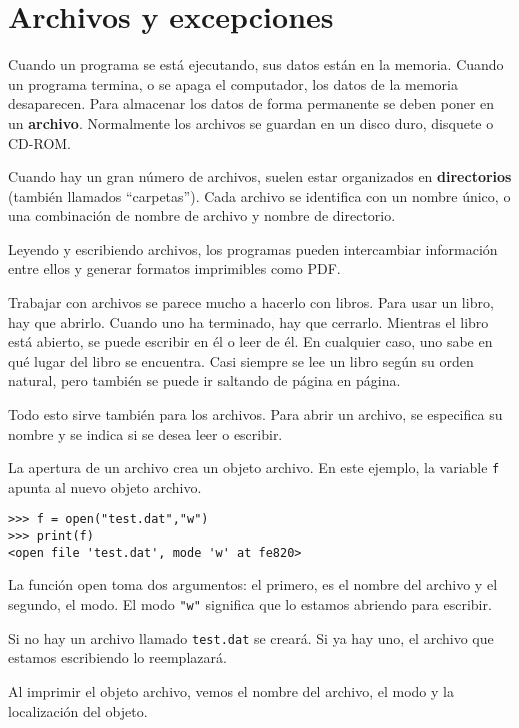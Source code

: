 
\chapter{Archivos y excepciones}


Cuando un programa se está ejecutando, sus datos están en la memoria.
Cuando un programa termina, o se apaga el computador, los datos de
la memoria desaparecen. Para almacenar los datos de forma permanente
se deben poner en un \textbf{archivo}. Normalmente los archivos se
guardan en un disco duro, disquete o CD-ROM.

Cuando hay un gran número de archivos, suelen estar organizados en
\textbf{directorios} (también llamados ``carpetas''). Cada archivo
se identifica con un nombre único, o una combinación de nombre de
archivo y nombre de directorio.

Leyendo y escribiendo archivos, los programas pueden intercambiar
información entre ellos y generar formatos imprimibles como PDF.

Trabajar con archivos se parece mucho a hacerlo con libros. Para usar
un libro, hay que abrirlo. Cuando uno ha terminado, hay que cerrarlo.
Mientras el libro está abierto, se puede escribir en él o leer de
él. En cualquier caso, uno sabe en qué lugar del libro se encuentra.
Casi siempre se lee un libro según su orden natural, pero también
se puede ir saltando de página en página.

Todo esto sirve también para los archivos. Para abrir un archivo,
se especifica su nombre y se indica si se desea leer o escribir.

La apertura de un archivo crea un objeto archivo. En este ejemplo,
la variable \texttt{f} apunta al nuevo objeto archivo.
\begin{lstlisting}
>>> f = open("test.dat","w")
>>> print(f)
<open file 'test.dat', mode 'w' at fe820>
\end{lstlisting}
La función open toma dos argumentos: el primero, es el nombre del
archivo y el segundo, el modo. El modo {\verb+"w"+} significa que
lo estamos abriendo para escribir.

Si no hay un archivo llamado \texttt{test.dat} se creará. Si ya hay
uno, el archivo que estamos escribiendo lo reemplazará.

Al imprimir el objeto archivo, vemos el nombre del archivo, el modo
y la localización del objeto.

